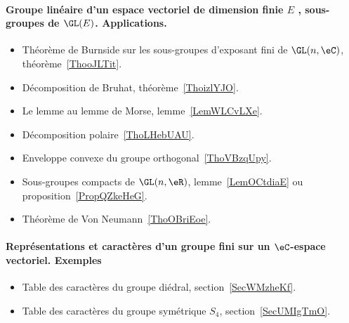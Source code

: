 \paragraph{Groupe linéaire d’un espace vectoriel de dimension finie $E$ , sous-groupes de $\GL(E)$. Applications.}
\begin{itemize}
    \item Théorème de Burnside sur les sous-groupes d'exposant fini de \( \GL(n,\eC)\), théorème~\ref{ThooJLTit}.
    \item Décomposition de Bruhat, théorème~\ref{ThoizlYJO}.
    \item Le lemme au lemme de Morse, lemme~\ref{LemWLCvLXe}.
    \item Décomposition polaire~\ref{ThoLHebUAU}.
    \item Enveloppe convexe du groupe orthogonal~\ref{ThoVBzqUpy}.
    \item Sous-groupes compacts de \( \GL(n,\eR)\), lemme~\ref{LemOCtdiaE} ou proposition~\ref{PropQZkeHeG}.
    \item Théorème de Von Neumann~\ref{ThoOBriEoe}.
\end{itemize}
\paragraph{Représentations et caractères d'un groupe fini sur un \( \eC\)-espace vectoriel. Exemples}
\begin{itemize}
    \item Table des caractères du groupe diédral, section~\ref{SecWMzheKf}.
    \item Table des caractères du groupe symétrique \( S_4\), section~\ref{SecUMIgTmO}.
\end{itemize}
